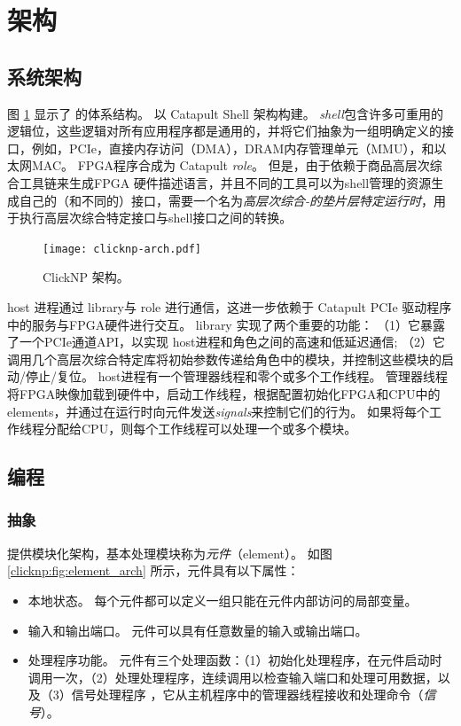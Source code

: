 \section{架构}
\label{clicknp:sec:architecture}

\subsection{系统架构}
\label{clicknp:subsec:sysarch}

图 \ref{clicknp:fig:clicknp} 显示了 \name 的体系结构。
\name 以 Catapult Shell 架构构建\cite {putnam2014reconfigurable}。
\textit {shell}包含许多可重用的逻辑位，这些逻辑对所有应用程序都是通用的，并将它们抽象为一组明确定义的接口，例如，PCIe，直接内存访问（DMA），DRAM内存管理单元（MMU），和以太网MAC。
\name FPGA程序合成为 Catapult \textit {role}。
但是，由于\name 依赖于商品高层次综合工具链来生成FPGA 硬件描述语言，并且不同的工具可以为shell管理的资源生成自己的（和不同的）接口，需要一个名为\textit {高层次综合-的垫片层特定运行时}，用于执行高层次综合特定接口与shell接口之间的转换。


\begin{figure}
	\centering
	\texttt{[image: clicknp-arch.pdf]}
	\caption{ClickNP 架构。}
	\label{clicknp:fig:clicknp}
\end{figure}


\name{} host 进程通过 \name{} library与 \name{} role 进行通信，这进一步依赖于 Catapult PCIe 驱动程序中的服务与FPGA硬件进行交互。
\name{} library 实现了两个重要的功能：
（1）它暴露了一个PCIe通道API，以实现 \name{} host进程和角色之间的高速和低延迟通信;
（2）它调用几个高层次综合特定库将初始参数传递给角色中的模块，并控制这些模块的启动/停止/复位。
\name{} host进程有一个管理器线程和零个或多个工作线程。
管理器线程将FPGA映像加载到硬件中，启动工作线程，根据配置初始化FPGA和CPU中的\name elements，并通过在运行时向元件发送\textit {signals}来控制它们的行为。
如果将每个工作线程分配给CPU，则每个工作线程可以处理一个或多个模块。

\subsection{\name 编程}

\subsubsection{抽象}

\name 提供模块化架构，基本处理模块称为\textit{元件}（element）。
如图 \ref{clicknp:fig:element_arch} 所示，\name 元件具有以下属性：
\begin{itemize}
\item 本地状态。 每个元件都可以定义一组只能在元件内部访问的局部变量。
\item 输入和输出端口。 元件可以具有任意数量的输入或输出端口。
\item 处理程序功能。 元件有三个处理函数：（1）初始化处理程序，在元件启动时调用一次，（2）处理处理程序，连续调用以检查输入端口和处理可用数据，以及（3）信号处理程序 ，它从主机程序中的管理器线程接收和处理命令（\textit {信号}）。
\end{itemize}

